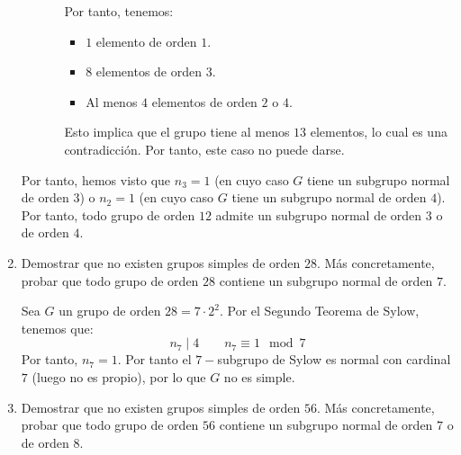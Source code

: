 \begin{ejercicio}
\begin{enumerate}
\begin{itemize}
\begin{itemize}
                Por tanto, tenemos:
                \begin{itemize}
                    \item $1$ elemento de orden $1$.
                    \item $8$ elementos de orden $3$.
                    \item Al menos $4$ elementos de orden $2$ o $4$.
                \end{itemize}
                Esto implica que el grupo tiene al menos $13$ elementos, lo cual es una contradicción. Por tanto, este caso no puede darse.
            \end{itemize}
        \end{itemize}

        Por tanto, hemos visto que $n_3=1$ (en cuyo caso $G$ tiene un subgrupo normal de orden $3$) o $n_2=1$ (en cuyo caso $G$ tiene un subgrupo normal de orden $4$). Por tanto, todo grupo de orden $12$ admite un subgrupo normal de orden $3$ o de orden $4$.


        \item Demostrar que no existen grupos simples de orden $28$. Más concretamente, probar que todo grupo de orden $28$ contiene un subgrupo normal de orden $7$.
        
        Sea $G$ un grupo de orden $28=7\cdot 2^2$. Por el Segundo Teorema de Sylow, tenemos que:
        \begin{equation*}
            n_7 \mid 4 \qquad n_7 \equiv 1 \mod 7
        \end{equation*}
        Por tanto, $n_7=1$. Por tanto el $7-$subgrupo de Sylow es normal con cardinal $7$ (luego no es propio), por lo que $G$ no es simple.
        \item Demostrar que no existen grupos simples de orden $56$. Más concretamente, probar que todo grupo de orden $56$ contiene un subgrupo normal de orden $7$ o de orden $8$.
        

\end{enumerate}
\end{ejercicio}
